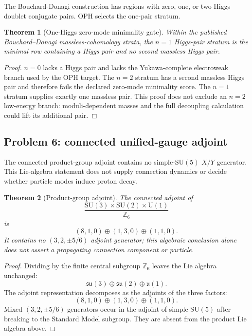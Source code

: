 \documentclass[11pt]{article}
\newtheorem{theorem}{Theorem}[section]
\theoremstyle{remark}
\theoremstyle{plain}
\newcommand{\SU}{\mathrm{SU}}
\newcommand{\U}{\mathrm{U}}
\newcommand{\Z}{\mathbb Z}
\begin{document}
The Bouchard-Donagi construction has regions with zero, one, or two Higgs doublet conjugate
pairs. OPH selects the one-pair stratum.

\begin{theorem}[One-Higgs zero-mode minimality gate]
Within the published Bouchard--Donagi massless-cohomology strata, the \(n=1\) Higgs-pair
stratum is the minimal row containing a Higgs pair and no second massless Higgs pair.
\end{theorem}

\begin{proof}
\(n=0\) lacks a Higgs pair and lacks the Yukawa-complete electroweak branch
used by the OPH target. The \(n=2\) stratum has a second massless Higgs pair and therefore fails
the declared zero-mode minimality score. The \(n=1\) stratum supplies exactly one massless pair.
This proof does not exclude an \(n=2\) low-energy branch: moduli-dependent masses and the full
decoupling calculation could lift its additional pair.
\end{proof}

\subsection{Problem 6: connected unified-gauge adjoint}

The connected product-group adjoint contains no simple-\(\SU(5)\) \(X/Y\) generator.
This Lie-algebra statement does not supply connection dynamics or decide whether particle modes
induce proton decay.

\begin{theorem}[Product-group adjoint]
The connected adjoint of
\[
\frac{\SU(3)\times\SU(2)\times\U(1)}{\Z_6}
\]
is
\[
(8,1,0)\oplus(1,3,0)\oplus(1,1,0).
\]
It contains no \((3,2,\pm5/6)\) adjoint generator; this algebraic conclusion alone does not
assert a propagating connection component or particle.
\end{theorem}

\begin{proof}
Dividing by the finite central subgroup \(\Z_6\) leaves the Lie algebra unchanged:
\[
\mathfrak{su}(3)\oplus\mathfrak{su}(2)\oplus\mathfrak{u}(1).
\]
The adjoint representation decomposes as the adjoints of the three factors:
\[
(8,1,0)\oplus(1,3,0)\oplus(1,1,0).
\]
Mixed \((3,2,\pm5/6)\) generators occur in the adjoint of simple \(\SU(5)\) after breaking to
the Standard Model subgroup. They are absent from the product Lie algebra above.
\end{proof}
\end{document}
